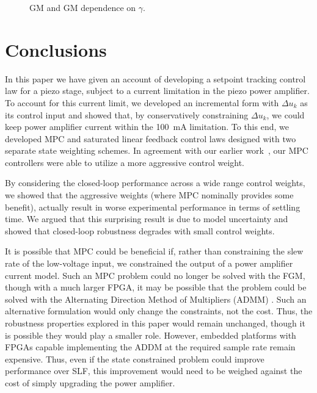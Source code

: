 \documentclass[twocolumn,twoside]{IEEEtran}
\begin{document}
\begin{figure}[ht!]
  
  \caption{GM and GM dependence on $\gamma$.}
  \label{fig:gmpm}
\end{figure}

\section{Conclusions}
In this paper we have given an account of developing a setpoint tracking control law for a piezo stage, subject to a current limitation in the piezo power amplifier. To account for this current limit, we developed an incremental form with $\Delta u_k$ as its control input and showed that, by conservatively constraining $\Delta u_k$, we could keep power amplifier current within the 100~mA limitation. To this end, we developed MPC and saturated linear feedback control laws designed with two separate state weighting schemes. In agreement with our earlier work~\cite{braker_application_2017}, our MPC controllers were able to utilize a more aggressive control weight.

By considering the closed-loop performance across a wide range control weights, we showed that the aggressive weights (where MPC nominally provides some benefit), actually result in worse experimental performance in terms of settling time. We argued that this surprising result is due to model uncertainty and showed that closed-loop robustness degrades with small control weights. 

It is possible that MPC could be beneficial if, rather than constraining the slew rate of the low-voltage input, we constrained the output of a power amplifier current model. Such an MPC problem could no longer be solved with the FGM, though with a much larger FPGA, it may be possible that the problem could be solved with the Alternating Direction Method of Multipliers (ADMM) \cite{Jerez_Trans_2014}. Such an alternative formulation would only change the constraints, not the cost. Thus, the robustness properties explored in this paper would remain unchanged, though it is possible they would play a smaller role. However, embedded platforms with FPGAs capable implementing the ADDM at the required sample rate remain expensive. Thus, even if the state constrained problem could improve performance over SLF, this improvement would need to be weighed against the cost of simply upgrading the power amplifier. 
\end{document}
